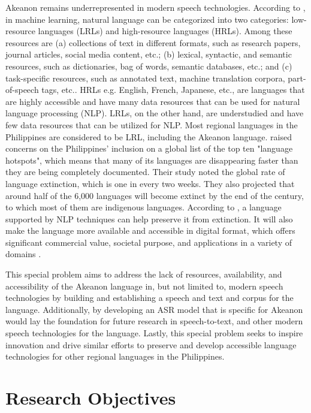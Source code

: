Akeanon remains underrepresented in modern speech technologies. According to , in machine learning, natural language can be categorized into two categories: low-resource languages (LRLs) and high-resource languages (HRLs). Among these resources are (a) collections of text in different formats, such as research papers, journal articles, social media content, etc.; (b) lexical, syntactic, and semantic resources, such as dictionaries, bag of words, semantic databases, etc.; and (c) task-specific resources, such as annotated text, machine translation corpora, part-of-speech tags, etc.. HRLs e.g. English, French, Japanese, etc., are languages that are highly accessible and have many data resources that can be used for natural language processing (NLP). LRLs, on the other hand, are understudied and have few data resources that can be utilized for NLP.  Most regional languages in the Philippines are considered to be LRL, including the Akeanon language.  raised concerns on the Philippines' inclusion on a global list of the top ten "language hotspots", which means that many of its languages are disappearing faster than they are being completely documented. Their study noted the global rate of language extinction, which is one in every two weeks. They also projected that around half of the 6,000 languages will become extinct by the end of the century, to which most of them are indigenous languages. According to , a language supported by NLP techniques can help preserve it from extinction. It will also make the language more available and accessible in digital format, which offers significant commercial value, societal purpose, and applications in a variety of domains \cite{Tsvetkov:2017}.

This special problem aims to address the lack of resources, availability, and accessibility of the Akeanon language in, but not limited to, modern speech technologies by building and establishing a speech and text and corpus for the language. Additionally, by developing an ASR model that is specific for Akeanon would lay the foundation for future research in speech-to-text, and other modern speech technologies for the language. Lastly, this special problem seeks to inspire innovation and drive similar efforts to preserve and develop accessible language technologies for other regional languages in the Philippines.

\section{Research Objectives}
\label{sec:researchobjectives}

